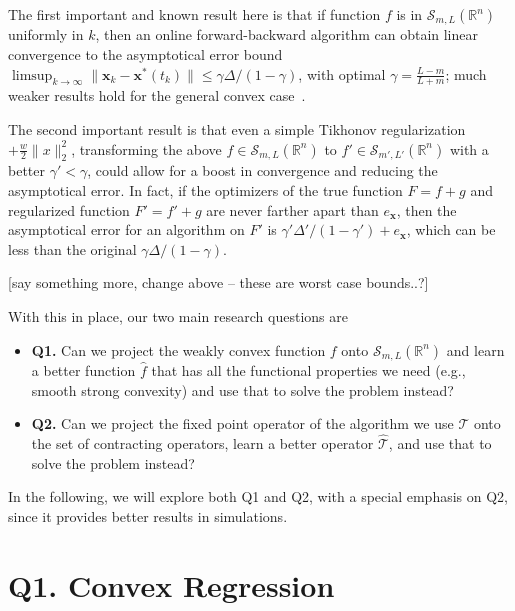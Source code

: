 \documentclass{article}
\newcommand{\R}{\mathbb{R}}
\newcommand{\x}{\mathbold{x}}
\newcommand{\andrea}[1]{{\color{red}[#1]}}
\begin{document}
The first important and known result here is that if function $f$ is in $\mathcal{S}_{m,L}(\R^n)$ uniformly in $k$, then an online forward-backward algorithm can obtain linear convergence to the asymptotical error bound $\limsup_{k\to\infty}\|\x_k - \x^*(t_k)\| \leq \gamma\Delta/(1-\gamma)$, with optimal $\gamma = \frac{L-m}{L+m}$; much weaker results hold for the general convex case~\cite{Simonetto20XX}.

The second important result is that even a simple Tikhonov regularization $+ \frac{w}{2} \|x\|^2_2$, transforming the above $f \in \mathcal{S}_{m,L}(\R^n)$ to $f' \in \mathcal{S}_{m',L'}(\R^n)$ with a better $\gamma'<\gamma$, could allow for a boost in convergence and reducing the asymptotical error. In fact, if the optimizers of the true function $F = f+g$ and regularized function $F' = f'+g$ are never farther apart than $e_{\x}$, then the asymptotical error for an algorithm on $F'$ is $\gamma'\Delta'/(1-\gamma') + e_{\x}$, which can be less than the original $\gamma\Delta/(1-\gamma)$.   

\andrea{say something more, change above -- these are worst case bounds..?}

With this in place, our two main research questions are
\begin{itemize}
\item {\bf Q1.} Can we project the weakly convex function $f$ onto $\mathcal{S}_{m,L}(\R^n)$ and learn a better function $\hat{f}$ that has all the functional properties we need (e.g., smooth strong convexity) and use that to solve the problem instead?

\item {\bf Q2.} Can we project the fixed point operator of the algorithm we use $\mathcal{T}$ onto the set of contracting operators, learn a better operator $\hat{\mathcal{T}}$, and use that to solve the problem instead?

\end{itemize}

In the following, we will explore both Q1 and Q2, with a special emphasis on Q2, since it provides better results in simulations. 

\section{Q1. Convex Regression}
\end{document}

